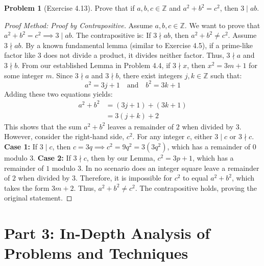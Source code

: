 \documentclass[11pt]{article}
\theoremstyle{definition}
\newtheorem{problem}{Problem}
\theoremstyle{remark}
\begin{document}
\begin{problem}[Exercise 4.13]
Prove that if $a, b, c \in \mathbb{Z}$ and $a^2 + b^2 = c^2$, then $3 \mid ab$.
\end{problem}
\begin{proof}[Proof Method: Proof by Contrapositive]
Assume $a, b, c \in \mathbb{Z}$. We want to prove that $a^2 + b^2 = c^2 \implies 3 \mid ab$.
The contrapositive is: If $3 \nmid ab$, then $a^2 + b^2 \neq c^2$.
Assume $3 \nmid ab$. By a known fundamental lemma (similar to Exercise 4.5), if a prime-like factor like $3$ does not divide a product, it divides neither factor. Thus, $3 \nmid a$ and $3 \nmid b$.
From our established Lemma in Problem 4.4, if $3 \nmid x$, then $x^2 = 3m + 1$ for some integer $m$. 
Since $3 \nmid a$ and $3 \nmid b$, there exist integers $j, k \in \mathbb{Z}$ such that:
\[ a^2 = 3j + 1 \quad \text{and} \quad b^2 = 3k + 1 \]
Adding these two equations yields:
\begin{align*}
a^2 + b^2 &= (3j + 1) + (3k + 1) \\
&= 3(j + k) + 2
\end{align*}
This shows that the sum $a^2 + b^2$ leaves a remainder of $2$ when divided by $3$. 
However, consider the right-hand side, $c^2$. For any integer $c$, either $3 \mid c$ or $3 \nmid c$.
\textbf{Case 1:} If $3 \mid c$, then $c = 3q \implies c^2 = 9q^2 = 3(3q^2)$, which has a remainder of $0$ modulo $3$.
\textbf{Case 2:} If $3 \nmid c$, then by our Lemma, $c^2 = 3p + 1$, which has a remainder of $1$ modulo $3$.
In no scenario does an integer square leave a remainder of $2$ when divided by $3$. Therefore, it is impossible for $c^2$ to equal $a^2 + b^2$, which takes the form $3m + 2$. 
Thus, $a^2 + b^2 \neq c^2$. The contrapositive holds, proving the original statement.
\end{proof}

\newpage
\section{Part 3: In-Depth Analysis of Problems and Techniques}
\end{document}
